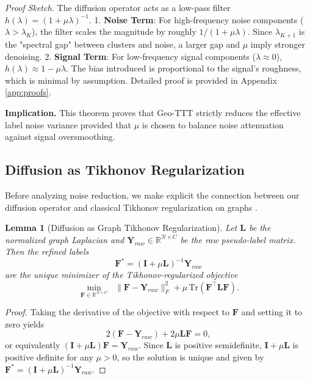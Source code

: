 \documentclass{article}
\theoremstyle{plain}
\newtheorem{lemma}[theorem]{Lemma}
\theoremstyle{definition}
\theoremstyle{remark}
\newcommand{\R}{\mathbb{R}}
\newcommand{\Lap}{\mathbf{L}}      %
\newcommand{\F}{\mathbf{F}}        %
\newcommand{\Y}{\mathbf{Y}}        %
\begin{document}
\textit{Proof Sketch.} The diffusion operator acts as a low-pass filter $h(\lambda) = (1+\mu\lambda)^{-1}$.
1. \textbf{Noise Term}: For high-frequency noise components ($\lambda > \lambda_K$), the filter scales the magnitude by roughly $1/(1+\mu\lambda)$. Since $\lambda_{K+1}$ is the "spectral gap" between clusters and noise, a larger gap and $\mu$ imply stronger denoising.
2. \textbf{Signal Term}: For low-frequency signal components ($\lambda \approx 0$), $h(\lambda) \approx 1 - \mu\lambda$. The bias introduced is proportional to the signal's roughness, which is minimal by assumption.
Detailed proof is provided in Appendix \ref{app:proofs}.

\textbf{Implication.} This theorem proves that Geo-TTT strictly reduces the effective label noise variance provided that $\mu$ is chosen to balance noise attenuation against signal oversmoothing.

\subsection{Diffusion as Tikhonov Regularization}

Before analyzing noise reduction, we make explicit the connection between our diffusion operator and classical Tikhonov regularization on graphs \cite{belkin2006manifoldreg, chapelle2006ssl}.

\begin{lemma}[Diffusion as Graph Tikhonov Regularization]
\label{lem:tikhonov}
Let $\Lap$ be the normalized graph Laplacian and $\Y_{raw} \in \R^{N \times C}$ be the raw pseudo-label matrix. Then the refined labels
\[
\F^* = (\mathbf{I} + \mu \Lap)^{-1} \Y_{raw}
\]
are the unique minimizer of the Tikhonov-regularized objective
\begin{equation}
\min_{\F \in \R^{N \times C}} \;\; \|\F - \Y_{raw}\|_F^2 + \mu \,\mathrm{Tr}(\F^\top \Lap \F).
\end{equation}
\end{lemma}

\begin{proof}
Taking the derivative of the objective with respect to $\F$ and setting it to zero yields
\[
2(\F - \Y_{raw}) + 2\mu \Lap \F = 0,
\]
or equivalently $(\mathbf{I} + \mu \Lap)\F = \Y_{raw}$. Since $\Lap$ is positive semidefinite, $\mathbf{I} + \mu \Lap$ is positive definite for any $\mu > 0$, so the solution is unique and given by $\F^* = (\mathbf{I} + \mu \Lap)^{-1} \Y_{raw}$.
\end{proof}
\end{document}
